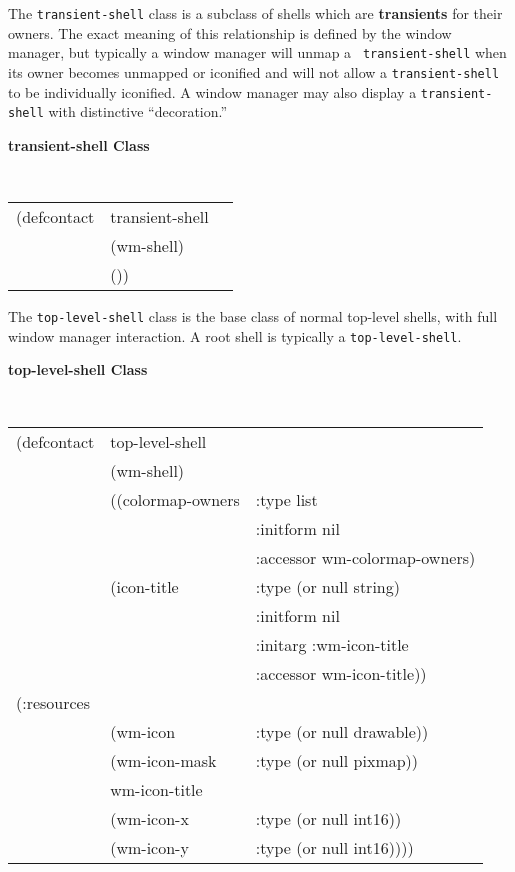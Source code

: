 
The {\tt transient-shell} class is
a subclass of shells which are {\bf transients}
for
their owners. The exact meaning of this relationship is defined by the
window manager, but typically a window manager will unmap a {\tt
transient-shell} when its owner becomes unmapped or iconified and will
not allow a {\tt transient-shell} to be individually iconified.  A window
manager may also display a {\tt transient-shell} with distinctive
``decoration.''

{\samepage 
{\large {\bf transient-shell \hfill Class}} 
\begin{flushright} \parbox[t]{6.125in}{
\tt
\begin{tabular}{lll}
\raggedright
(defcontact &transient-shell \\
& (wm-shell)\\
&  ())
\end{tabular}
\rm

}\end{flushright}}
 


The {\tt top-level-shell} class is the base class of normal top-level
shells, with full window manager interaction.  A root shell is typically
a {\tt top-level-shell}.

{\samepage 
{\large {\bf top-level-shell \hfill Class}} 
\begin{flushright} \parbox[t]{6.125in}{
\tt
\begin{tabular}{lll}
\raggedright
(defcontact & top-level-shell \\
&  (wm-shell) \\
&  ((colormap-owners   & :type     list \\
&		       & :initform nil  \\
&		       & :accessor wm-colormap-owners)    \\
&   (icon-title        & :type     (or null string) \\
&		       & :initform nil  \\
&		       & :initarg  :wm-icon-title \\
&		       & :accessor wm-icon-title))    \\
(:resources\\
&    (wm-icon        &:type (or null drawable))            \\
&    (wm-icon-mask   &:type (or null pixmap))                 \\
&     wm-icon-title \\
&    (wm-icon-x      &:type (or null int16))              \\
&    (wm-icon-y      &:type (or null int16))))
\end{tabular}
\rm

}\end{flushright}}

